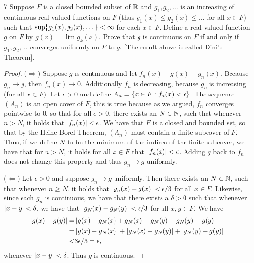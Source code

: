 \begin{exercise}{7}
Suppose $F$ is a closed bounded subset of $\mathbb{R}$ and $g_1, g_2, \dots$ is an increasing of continuous real valued functions on $F$ (thus $g_1(x) \leq g_2(x) \leq \dots$ for all $x \in F$) such that $\sup\{g_1(x), g_2(x),\dots\} < \infty$ for each $x \in F$.
Define a real valued function $g$ on $F$ by $g(x) = \lim g_k(x)$.
Prove that $g$ is continuous on $F$ if and only if $g_1,g_2,\dots$ converges uniformly on $F$ to $g$.
[The result above is called Dini's Theorem].
\end{exercise}
\begin{proof}
($\Rightarrow$)
Suppose $g$ is continuous and let $f_n(x) - g(x) - g_n(x)$.
Because $g_n \to g$, then $f_n(x) \to 0$.
Additionally $f_n$ is decreasing, because $g_n$ is increasing (for all $x \in F)$.
Let $\epsilon > 0$ and define $A_n = \{x \in F: f_n(x) < \epsilon\}$.
The sequence $(A_n)$ is an open cover of $F$, this is true because as we argued, $f_n$ converges pointwise to 0, so that for all $\epsilon > 0$, there exists an $N\in\mathbb{N}$, such that whenever $n>N$, it holds that $\left\lvert f_n(x)\right\rvert < \epsilon$.
We have that $F$ is a closed and bounded set, so that by the Heine-Borel Theorem, $(A_n)$ must contain a finite subcover of $F$.
Thus, if we define $N$ to be the minimum of the indices of the finite subcover, we have that for $n>N$, it holds for all $x\in F$ that $\left\lvert f_n(x)\right\rvert < \epsilon$.
Adding $g$ back to $f_n$ does not change this property and thus $g_n \to g$ uniformly.

($\Leftarrow$)
Let $\epsilon > 0$ and suppose $g_n \to g$ uniformly.
Then there exists an $N \in \mathbb{N}$, such that whenever $n \geq N$, it holds that $\left\lvert g_n(x) - g(x)\right\rvert < \epsilon/3$ for all $x \in F$.
Likewise, since each $g_n$ is continuous, we have that there exists a $\delta > 0$ such that whenever $\left\lvert x - y\right\rvert < \delta$, we have that $\left\lvert g_N(x) - g_N(y)\right\rvert < \epsilon/3$ for all $x,y \in F$.
We have
\begin{align*}
    \left\lvert g(x) -g(y)\right\rvert
    =& \left\lvert g(x) - g_N(x) + g_N(x) - g_N(y) + g_N(y) - g(y)\right\rvert\\
    =& \left\lvert g(x) - g_N(x)\right\rvert 
    + \left\lvert g_N(x) - g_N(y)\right\rvert 
    + \left\lvert g_N(y) - g(y)\right\rvert\\
    <& 3\epsilon/3 = \epsilon,
\end{align*}
whenever $\left\lvert x - y\right\rvert < \delta$.
Thus $g$ is continuous.
\end{proof} 

